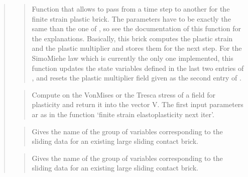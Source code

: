 \documentclass[a4paper,11pt,english]{sphinxmanual}
\begin{document}
\begin{quote}
\begin{quote}
Function that allows to pass from a time step to another for the
finite strain plastic brick. The parameters have to be exactly the
same than the one of ,
so see the documentation of this function for the explanations.
Basically, this brick computes the plastic strain
and the plastic multiplier and stores them for the next step.
For the Simo\sphinxhyphen{}Miehe law which is currently the only one implemented,
this function updates the state variables defined in the last two
entries of , and resets the plastic multiplier field given
as the second entry of .
\end{quote}

\begin{quote}

Compute on  the Von\sphinxhyphen{}Mises or the Tresca stress of a field for plasticity and return it into the vector V.
The first input parameters ar as in the function ‘finite strain elastoplasticity next iter’.
\end{quote}

\begin{quote}

Gives the name of the group of variables corresponding to the
sliding data for an existing large sliding contact brick.
\end{quote}

\begin{quote}

Gives the name of the group of variables corresponding to the
sliding data for an existing large sliding contact brick.
\end{quote}

\begin{quote}


\end{quote}
\end{quote}
\end{document}
